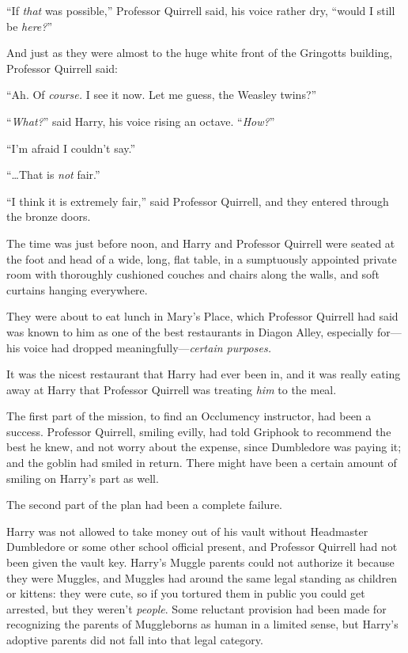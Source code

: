“If \emph{that} was possible,” Professor Quirrell said, his voice rather dry, “would I still be \emph{here?}”

And just as they were almost to the huge white front of the Gringotts building, Professor Quirrell said:

“Ah. Of \emph{course.} I see it now. Let me guess, the Weasley twins?”

“\emph{What?}” said Harry, his voice rising an octave.
“\emph{How?}”

“I’m afraid I couldn’t say.”

“…That is \emph{not} fair.”

“I think it is extremely fair,” said Professor Quirrell, and they entered through the bronze doors.

\later

The time was just before noon, and Harry and Professor Quirrell were seated at the foot and head of a wide, long, flat table, in a sumptuously appointed private room with thoroughly cushioned couches and chairs along the walls, and soft curtains hanging everywhere.

They were about to eat lunch in Mary’s Place, which Professor Quirrell had said was known to him as one of the best restaurants in Diagon Alley, especially for—his voice had dropped meaningfully—\emph{certain purposes.}

It was the nicest restaurant that Harry had ever been in, and it was really eating away at Harry that Professor Quirrell was treating \emph{him} to the meal.

The first part of the mission, to find an Occlumency instructor, had been a success. Professor Quirrell, smiling evilly, had told Griphook to recommend the best he knew, and not worry about the expense, since Dumbledore was paying it; and the goblin had smiled in return. There might have been a certain amount of smiling on Harry’s part as well.

The second part of the plan had been a complete failure.

Harry was not allowed to take money out of his vault without Headmaster Dumbledore or some other school official present, and Professor Quirrell had not been given the vault key. Harry’s Muggle parents could not authorize it because they were Muggles, and Muggles had around the same legal standing as children or kittens: they were cute, so if you tortured them in public you could get arrested, but they weren’t \emph{people}. Some reluctant provision had been made for recognizing the parents of Muggleborns as human in a limited sense, but Harry’s adoptive parents did not fall into that legal category.

